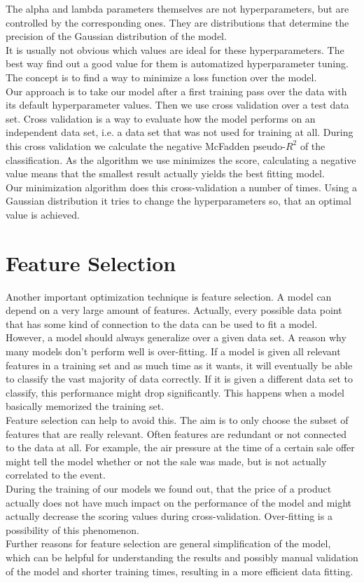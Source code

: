 \documentclass[sigconf]{acmart}
\begin{document}
The alpha and lambda parameters themselves are not hyperparameters, but are controlled by the corresponding ones. They are distributions that determine the precision of the Gaussian distribution of the model.\\
It is usually not obvious which values are ideal for these hyperparameters. The best way find out a good value for them is automatized hyperparameter tuning. The concept is to find a way to minimize a loss function over the model.\\
Our approach is to take our model after a first training pass over the data with its default hyperparameter values. Then we use cross validation over a test data set. Cross validation is a way to evaluate how the model performs on an independent data set, i.e. a data set that was not used for training at all. During this cross validation we calculate the negative McFadden pseudo-$R^2$ of the classification. As the algorithm we use minimizes the score, calculating a negative value means that the smallest result actually yields the best fitting model.\\
Our minimization algorithm does this cross-validation a number of times. Using a Gaussian distribution it tries to change the hyperparameters so, that an optimal value is achieved.

\section*{Feature Selection}
Another important optimization technique is feature selection. A model can depend on a very large amount of features. Actually, every possible data point that has some kind of connection to the data can be used to fit a model. However, a model should always generalize over a given data set. A reason why many models don't perform well is over-fitting. If a model is given all relevant features in a training set and as much time as it wants, it will eventually be able to classify the vast majority of data correctly. If it is given a different data set to classify, this performance might drop significantly. This happens when a model basically memorized the training set.\\
Feature selection can help to avoid this. The aim is to only choose the subset of features that are really relevant. Often features are redundant or not connected to the data at all. For example, the air pressure at the time of a certain sale offer might tell the model whether or not the sale was made, but is not actually correlated to the event.\\
During the training of our models we found out, that the price of a product actually does not have much impact on the performance of the model and might actually decrease the scoring values during cross-validation. Over-fitting is a possibility of this phenomenon.\\
Further reasons for feature selection are general simplification of the model, which can be helpful for understanding the results and possibly manual validation of the model and shorter training times, resulting in a more efficient data fitting.
\end{document}

